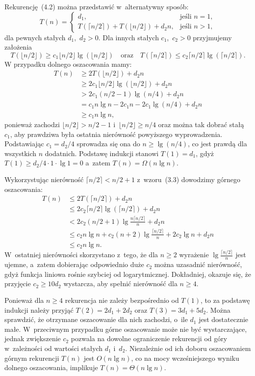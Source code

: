 \exercise %
Rekurencję~(4.2) można przedstawić w~alternatywny sposób:
\[
	T(n) =
	\begin{cases}
		d_1, & \text{jeśli $n=1$}, \\
		T(\lceil n/2\rceil)+T(\lfloor n/2\rfloor)+d_2n, & \text{jeśli $n>1$},
	\end{cases}
\]
dla pewnych stałych $d_1$,~$d_2>0$. Dla innych stałych $c_1$,~$c_2>0$ przyjmujemy założenia
\[
	T(\lfloor n/2\rfloor) \ge c_1\lfloor n/2\rfloor\lg(\lfloor n/2\rfloor) \quad\text{oraz}\quad T(\lceil n/2\rceil) \le c_2\lceil n/2\rceil\lg(\lceil n/2\rceil).
\]
W przypadku dolnego oszacowania mamy:
\begin{align*}
	T(n) &\ge 2T(\lfloor n/2\rfloor)+d_2n \\
	&\ge 2c_1\lfloor n/2\rfloor\lg(\lfloor n/2\rfloor)+d_2n \\
	&> 2c_1(n/2-1)\lg(n/4)+d_2n \\
	&= c_1n\lg n-2c_1n-2c_1\!\lg(n/4)+d_2n \\
	&\ge c_1n\lg n,
\end{align*}
ponieważ zachodzi $\lfloor n/2\rfloor>n/2-1$ i~$\lfloor n/2\rfloor\ge n/4$ oraz można tak dobrać stałą $c_1$, aby prawdziwa była ostatnia nierówność powyższego wyprowadzenia. Podstawiając $c_1=d_2/4$ sprowadza się ona do $n\ge\lg(n/4)$, co jest prawdą dla wszystkich $n$ dodatnich. Podstawę indukcji stanowi $T(1)=d_1$, gdyż $T(1)\ge d_2/4\cdot 1\cdot\lg1=0$ a~zatem $T(n)=\Omega(n\lg n)$.

Wykorzystując nierówność $\lceil n/2\rceil<n/2+1$ z~wzoru~(3.3) dowodzimy górnego oszacowania:
\begin{align*}
	T(n) &\le 2T(\lceil n/2\rceil)+d_2n \\
	&\le 2c_2\lceil n/2\rceil\lg(\lceil n/2\rceil)+d_2n \\
	&< 2c_2(n/2+1)\lg\frac{n\lceil n/2\rceil}{n}+d_2n \\
	&\le c_2n\lg n+c_2(n+2)\lg\frac{\lceil n/2\rceil}{n}+2c_2\lg n+d_2n \\
	&\le c_2n\lg n.
\end{align*}
W~ostatniej nierówności skorzystano z~tego, że dla $n\ge2$ wyrażenie $\lg\frac{\lceil n/2\rceil}{n}$ jest ujemne, a~zatem dobierając odpowiednio duże $c_2$ można uzasadnić nierówność, gdyż funkcja liniowa rośnie szybciej od logarytmicznej. Dokładniej, okazuje się, że przyjęcie $c_2\ge10d_2$ wystarcza, aby spełnić nierówność dla $n\ge4$.

Ponieważ dla $n\ge4$ rekurencja nie zależy bezpośrednio od $T(1)$, to za podstawę indukcji należy przyjąć $T(2)=2d_1+2d_2$ oraz $T(3)=3d_1+5d_2$. Można sprawdzić, że otrzymane oszacowanie dla nich zachodzi, o~ile $d_1$ jest dostatecznie małe. W~przeciwnym przypadku górne oszacowanie może nie być wystarczające, jednak zwiększenie $c_2$ pozwala na dowolne ograniczenie rekurencji od góry w~zależności od wartości stałych $d_1$ i~$d_2$. Niezależnie od ich doboru oszacowaniem górnym rekurencji $T(n)$ jest $O(n\lg n)$, co na mocy wcześniejszego wyniku dolnego oszacowania, implikuje $T(n)=\Theta(n\lg n)$.

